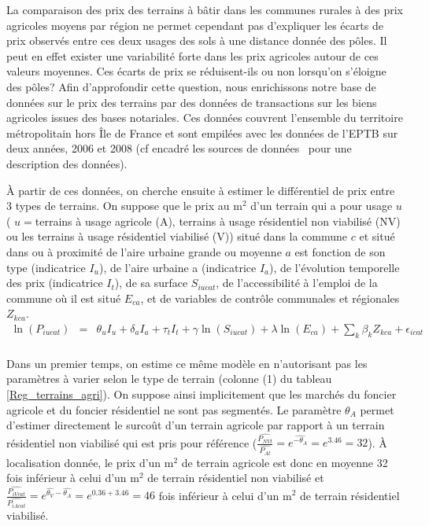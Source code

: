\documentclass[10.5pt,a4paper]{article}
\begin{document}
{La comparaison des prix des terrains à bâtir dans les communes rurales à des prix agricoles moyens par région ne permet cependant pas d'expliquer les écarts de prix observés entre ces deux usages des sols à une distance donnée des pôles. Il peut en effet exister une variabilité forte dans les prix agricoles autour de ces valeurs moyennes. Ces écarts de prix se réduisent-ils ou non lorsqu'on s'éloigne des pôles? Afin d'approfondir cette question, nous enrichissons notre base de données sur le prix des terrains par des données de transactions sur les biens agricoles issues des bases notariales. Ces données couvrent l'ensemble du territoire métropolitain hors Île de France et sont empilées avec les données de l'EPTB sur deux années, 2006 et 2008 (cf encadré \og les sources de données \fg~pour une description des données).\par 

\`{A} partir de ces données, on cherche ensuite à estimer le différentiel de prix entre 3 types de terrains. On suppose que le prix au m$^2$ d'un terrain qui a pour usage $u$ ( $u =$terrains à usage agricole (A), terrains à usage résidentiel non viabilisé (NV) ou les terrains à usage résidentiel viabilisé (V)) situé dans la commune $c$ et  situé dans ou à proximité de l'aire urbaine grande ou moyenne $a$ est fonction de son type (indicatrice $I_u$), de l'aire urbaine a  (indicatrice $I_a$), de l'évolution temporelle des prix (indicatrice $I_{t}$), de  sa surface $S_{iucat}$, de l'accessibilité à l'emploi  de la commune où il est situé $E_{ca}$, et de variables de contrôle communales et régionales $Z_{kca}$.
\begin{eqnarray*}
\ln(P_{iucat}) & =&  \theta_{u} I_u + \delta_{a} I_a + \tau_{t} I_{t}  +  \gamma \ln(S_{iucat}) + \lambda \ln(E_{ca}) +
\sum_k \beta_k Z_{kca}  + \epsilon_{icat} \\
\label{eq:reg_agri}
\end{eqnarray*}

Dans un premier temps, on estime ce même modèle en n'autorisant pas les paramètres à varier selon le type de terrain (colonne (1) du tableau \ref{Reg_terrains_agri}). On suppose ainsi implicitement que les marchés du foncier agricole et du foncier résidentiel ne sont pas segmentés. Le paramètre $\theta_{A}$ permet d'estimer directement le surcoût d'un terrain agricole par rapport à un terrain résidentiel non viabilisé qui est pris pour référence ($\frac{\hat{P_{NVt}}}{\hat{P_{At}}} = e^{\hat{-\theta_{A}}} = e^{3.46} =  32 $). \`{A} localisation donnée, le prix d'un m$^2$ de terrain agricole est donc en moyenne 32 fois inférieur à celui d'un m$^2$  de terrain résidentiel non viabilisé et $\frac{\hat{P_{iVcat}}}{\hat{P_{iAcat}}} =  e^{\hat{\theta_{V}} - \hat{\theta_{A}}} =e^{0.36+3.46} = 46 $ fois inférieur à celui d'un m$^2$  de terrain résidentiel viabilisé.\par

}
\end{document}
